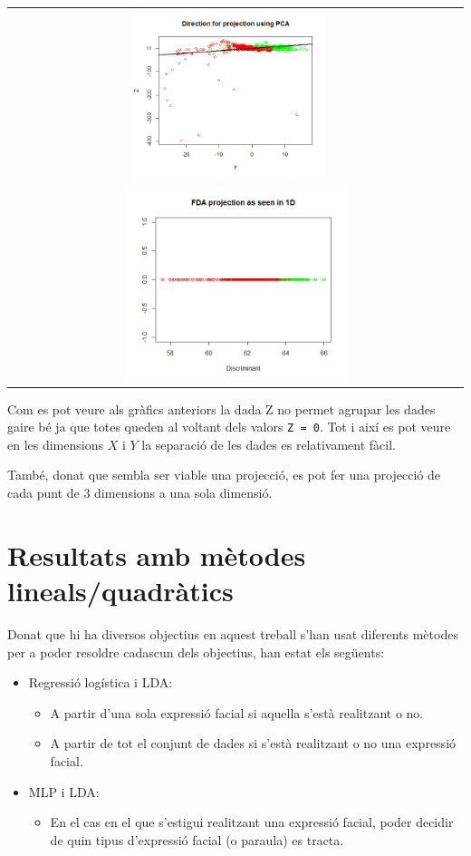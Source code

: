 \documentclass[a4paper]{article}
\begin{document}
\begin{longtable}{cc}
	\includegraphics[width=0.45\textwidth]{images/PCA_YZ} \\
	\multicolumn{2}{c}{\includegraphics[width=0.5\textwidth]{images/FDA_projection}}
\end{longtable}

Com es pot veure als gràfics anteriors la dada Z no permet agrupar les dades gaire bé ja que totes queden al voltant dels valors \verb|Z = 0|. Tot i així es pot veure en les dimensions $X$ i $Y$ la separació de les dades es relativament fàcil. 

També, donat que sembla ser viable una projecció, es pot fer una projecció de cada punt de 3 dimensions a una sola dimensió.

\section{Resultats amb mètodes lineals/quadràtics}
Donat que hi ha diversos objectius en aquest treball s'han usat diferents mètodes per a poder resoldre cadascun dels objectius, han estat els següents:
\begin{itemize}
	\item Regressió logística i LDA:
	\begin{itemize}
		\item A partir d'una sola expressió facial si aquella s'està realitzant o no.
		\item A partir de tot el conjunt de dades si s'està realitzant o no una expressió facial.
	\end{itemize}
	\item MLP i LDA:
	\begin{itemize}
		\item En el cas en el que s'estigui realitzant una expressió facial, poder decidir de quin tipus d'expressió facial (o paraula) es tracta.
	\end{itemize}
\end{itemize}
\end{document}
